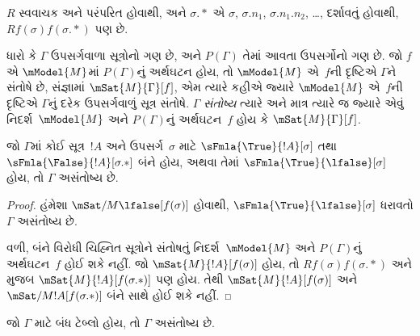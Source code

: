 $R$ સ્વવાચક અને પરંપરિત હોવાથી, અને $\sigma.{*}$
એ $\sigma$, $\sigma.n_1$, $\sigma.n_1.n_2$,
\dots, દર્શાવતું હોવાથી, $Rf(\sigma)f(\sigma.{*})$
પણ છે.

\begin{defn}
  ધારો કે $\Gamma$ ઉપસર્ગવાળા સૂત્રોનો ગણ છે,
  અને $P(\Gamma)$ તેમાં આવતા ઉપસર્ગોનો ગણ છે.
  જો $f$ એ $\mModel{M}$માં $P(\Gamma)$નું અર્થઘટન
  હોય, તો $\mModel{M}$ એ~$f$ની દૃષ્ટિએ $\Gamma$ને
  સંતોષે છે, સંજ્ઞામાં $\mSat{M}{\Gamma}[f]$,
  એમ ત્યારે કહીએ જ્યારે $\mModel{M}$ એ~$f$ની
  દૃષ્ટિએ $\Gamma$નું દરેક ઉપસર્ગવાળું સૂત્ર
  સંતોષે. $\Gamma$ \emph{સંતોષ્ય} ત્યારે અને માત્ર
  ત્યારે જ જ્યારે એવું નિદર્શ~$\mModel{M}$ અને
  $P(\Gamma)$નું અર્થઘટન~$f$ હોય કે
  $\mSat{M}{\Gamma}[f]$.
\end{defn}

\begin{prop}
  જો $\Gamma$માં કોઈ સૂત્ર~$!A$ અને
  ઉપસર્ગ~$\sigma$ માટે
  $\sFmla{\True}{!A}[\sigma]$ તથા
  $\sFmla{\False}{!A}[\sigma.{*}]$ બંને હોય,
  અથવા તેમાં $\sFmla{\True}{\lfalse}[\sigma]$
  હોય, તો $\Gamma$ અસંતોષ્ય છે.
\end{prop}

\begin{proof}
  હંમેશા $\mSat/{M}{\lfalse}[f(\sigma)]$ હોવાથી,
  $\sFmla{\True}{\lfalse}[\sigma]$ ધરાવતો
  $\Gamma$ અસંતોષ્ય છે.

  વળી, બંને વિરોધી ચિહ્નિત સૂત્રોને સંતોષતું
  નિદર્શ~$\mModel{M}$ અને $P(\Gamma)$નું અર્થઘટન~$f$
  હોઈ શકે નહીં. જો $\mSat{M}{!A}[f(\sigma)]$
  હોય, તો $Rf(\sigma)f(\sigma.{*})$ અને
   મુજબ
  $\mSat{M}{!A}[f(\sigma.{*})]$ પણ હોય.
  તેથી $\mSat{M}{!A}[f(\sigma)]$ અને
  $\mSat/{M}{!A}[f(\sigma.{*})]$ બંને સાથે
  હોઈ શકે નહીં.
\end{proof}

\begin{thm}[યથાર્થતા]
  જો $\Gamma$ માટે બંધ ટેબ્લો હોય,
  તો $\Gamma$ અસંતોષ્ય છે.
\end{thm}

